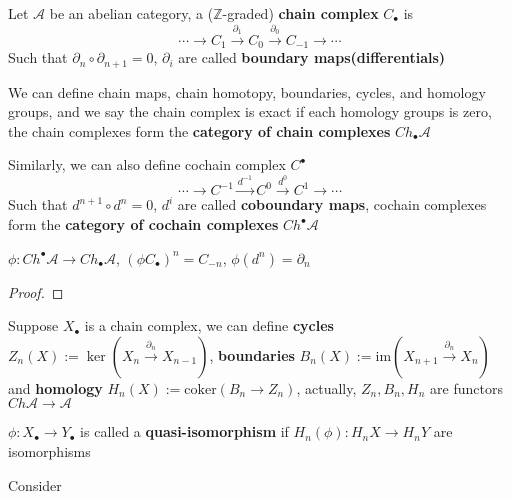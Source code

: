 \documentclass[../main.tex]{subfiles}
\begin{document}
\begin{definition}
Let $\mathscr A$ be an abelian category, a ($\mathbb Z$-graded) \textbf{chain complex} $C_\bullet$ is 
\[\cdots\to C_{1}\xrightarrow{\partial_1}C_0\xrightarrow{\partial_0}C_{-1}\to\cdots\]
Such that $\partial_{n}\circ\partial_{n+1}=0$, $\partial_i$ are called \textbf{boundary maps(differentials)} \par
We can define chain maps, chain homotopy, boundaries, cycles, and homology groups, and we say the chain complex is exact if each homology groups is zero, the chain complexes form the \textbf{category of chain complexes} $Ch_\bullet\mathscr A$ \par
Similarly, we can also define cochain complex $C^\bullet$
\[\cdots\to C^{-1}\xrightarrow{d^{-1}}C^0\xrightarrow{d^0}C^1\to\cdots\]
Such that $d^{n+1}\circ d^{n}=0$, $d^i$ are called \textbf{coboundary maps}, cochain complexes form the \textbf{category of cochain complexes} $Ch^\bullet\mathscr A$ 
\end{definition}

\begin{lemma}
$\phi:Ch^\bullet\mathscr A\to Ch_\bullet\mathscr A$, $(\phi C_\bullet)^n=C_{-n}$, $\phi(d^n)=\partial_n$
\end{lemma}

\begin{proof}

\end{proof}

\begin{definition}
Suppose $X_\bullet$ is a chain complex, we can define \textbf{cycles} $Z_n(X):=\ker(X_n\xrightarrow{\partial_n} X_{n-1})$, \textbf{boundaries} $B_n(X):=\mathrm{im}(X_{n+1}\xrightarrow{\partial_n} X_{n})$ and \textbf{homology} $H_n(X):=\mathrm{coker}(B_n\to Z_n)$, actually, $Z_n,B_n,H_n$ are functors $Ch\mathscr A\to\mathscr A$
\end{definition}

\begin{definition}
$\phi:X_\bullet\to Y_\bullet$ is called a \textbf{quasi-isomorphism} if $H_n(\phi):H_nX\to H_nY$ are isomorphisms
\end{definition}

\begin{example}
Consider
\begin{center}
\end{center}
\end{example}
\end{document}
